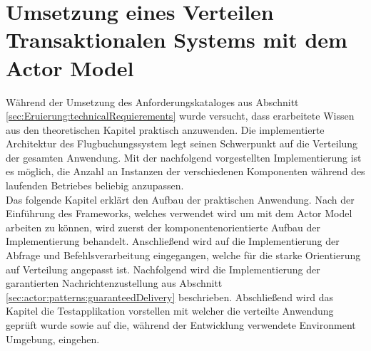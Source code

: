 \chapter{Umsetzung eines Verteilen Transaktionalen Systems mit dem Actor Model} 
\label{cha:practicalDevelopment}

Während der Umsetzung des Anforderungskataloges aus Abschnitt \ref{sec:Eruierung:technicalRequierements} wurde versucht, dass erarbeitete Wissen aus den theoretischen Kapitel praktisch anzuwenden. Die implementierte Architektur des Flugbuchungssystem legt seinen Schwerpunkt auf die Verteilung der gesamten Anwendung. Mit der nachfolgend vorgestellten Implementierung ist es möglich, die Anzahl an Instanzen der verschiedenen Komponenten während des laufenden Betriebes beliebig anzupassen. \\
Das folgende Kapitel erklärt den Aufbau der praktischen Anwendung. Nach der Einführung des Frameworks, welches verwendet wird um mit dem Actor Model arbeiten zu können, wird zuerst der komponentenorientierte Aufbau der Implementierung behandelt. Anschließend wird auf die Implementierung der Abfrage und Befehlsverarbeitung eingegangen, welche für die starke Orientierung auf Verteilung angepasst ist. Nachfolgend wird die Implementierung der garantierten Nachrichtenzustellung aus Abschnitt \ref{sec:actor:patterns:guaranteedDelivery} beschrieben. Abschließend wird das Kapitel die Testapplikation vorstellen mit welcher die verteilte Anwendung geprüft wurde sowie auf die, während der Entwicklung verwendete Environment Umgebung, eingehen.
% 
% 
% 
% 

